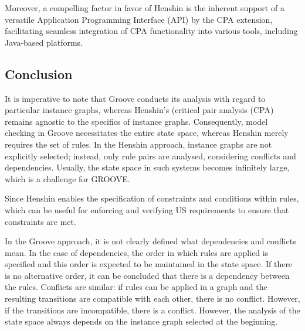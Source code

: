 Moreover, a compelling factor in favor of Henshin is the inherent support of a versatile Application Programming Interface (API) by the CPA extension, facilitating seamless integration of CPA functionality into various tools, including Java-based platforms.

\subsection{Conclusion}\label{henshin_groove_conclusion}
It is imperative to note that Groove conducts its analysis with regard to particular instance graphs, whereas Henshin's (critical pair analysis (CPA) remains agnostic to the specifics of instance graphs. Consequently, model checking in Groove necessitates the entire state space, whereas Henshin merely requires the set of rules. In the Henshin approach, instance graphs are not explicitly selected; instead, only rule pairs are analysed, considering conflicts and dependencies. Usually, the state space in such systems becomes infinitely large, which is a challenge for GROOVE.

Since Henshin enables the specification of constraints and conditions within rules, which can be useful for enforcing and verifying US requirements to ensure that constraints are met.

In the Groove approach, it is not clearly defined what dependencies and conflicts mean. In the case of dependencies, the order in which rules are applied is specified and this order is expected to be maintained in the state space. If there is no alternative order, it can be concluded that there is a dependency between the rules. Conflicts are similar: if rules can be applied in a graph and the resulting transitions are compatible with each other, there is no conflict. However, if the transitions are incompatible, there is a conflict. However, the analysis of the state space always depends on the instance graph selected at the beginning.
